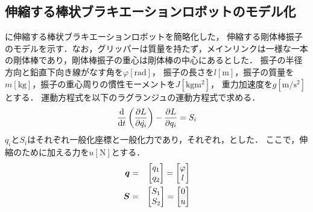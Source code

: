           \subsection{伸縮する棒状ブラキエーションロボットのモデル化}
          に伸縮する棒状ブラキエーションロボットを簡略化した，
          伸縮する剛体棒振子のモデルを示す．なお，グリッパーは質量を持たず，メインリンクは一様な一本の剛体棒であり，剛体棒振子の重心は剛体棒の中心にあるとした．
          振子の半径方向と鉛直下向き線がなす角を$\varphi [\mathrm{rad}]$，
          振子の長さを$l [\mathrm{m}]$，振子の質量を$m [\mathrm{kg}]$，振子の重心周りの慣性モーメントを$J [\mathrm{kg}\mathrm{m}^2]$，
          重力加速度を$g [\mathrm{m}/\mathrm{s}^2]$とする．
          運動方程式を以下のラグランジュの運動方程式で求める．
          \begin{eqnarray}
            \equlabel{Lagrange}
            \frac{\mathrm{d}}{\mathrm{d}t}\left(\frac{\partial L}{\partial \dot{q_i}}\right)-\frac{\partial L}{\partial q_i}=S_i
            \end{eqnarray} 
          $q_i$と$S_i$はそれぞれ一般化座標と一般化力であり，それぞれ，とした．
          ここで，伸縮のために加える力を$u[\mathrm{N}]$とする．
          \begin{eqnarray}
            \equlabel{qq}
            \bm{q}&=&
            \begin{bmatrix}
              q_1 \\
              q_2 \\
              \end{bmatrix}
            =
            \begin{bmatrix}
              \varphi \\
              l \\
              \end{bmatrix}\\
            \equlabel{SS}
            \bm{S}&=&
            \begin{bmatrix}
              S_1 \\
              S_2 \\
              \end{bmatrix}
            =
            \begin{bmatrix}
              0 \\
              u \\
              \end{bmatrix}
              \end{eqnarray}
